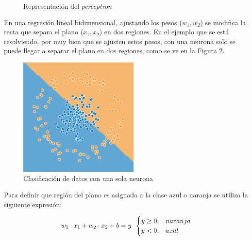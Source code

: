 \begin{itemize}
\begin{figure}[H]
        \captionsetup{justification=centering,margin=1.25cm}
        \caption{Representación del \textit{perceptron}}
        \label{perceptron}
    \end{figure}
    
    En una regresión lineal bidimensional, ajustando los pesos ($w_1,w_2$) se modifica la recta que separa el plano ($x_1,x_2$) en dos regiones. En el ejemplo que se está resolviendo, por muy bien que se ajusten estos pesos, con una neurona solo se puede llegar a separar el plano en dos regiones, como se ve en la Figura \ref{neurona}.
    
    \begin{figure}[h!]
        \centering
        \includegraphics[width=60mm, angle=0]{2/Fotos/neurona.png}
        \captionsetup{justification=centering,margin=1.25cm}
        \caption{Clasificación de datos con una sola neurona}
        \label{neurona}
    \end{figure}
    
    Para definir que región del plano es asignada a la clase azul o naranja se utiliza la siguiente expresión:
    
    \begin{equation}
        w_1 \cdot x_1 + w_2 \cdot x_2 + b = y \hspace*{5pt}
        \begin{cases}
            y \geq 0, & naranja\\
            y < 0, & azul%
        \end{cases}
        \label{eq:percepron}
    \end{equation}


\end{itemize}
